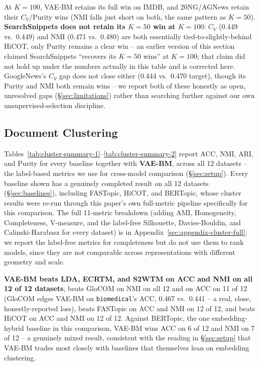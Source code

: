\documentclass[11pt]{article}
\begin{document}
At $K=100$, VAE-BM retains its full win on IMDB, and 20NG/AGNews retain their $C_V$/Purity wins (NMI falls just short on both, the same pattern as $K=50$). \textbf{SearchSnippets does not retain its $K=50$ win at $K=100$}: $C_V$ (0.449 vs.\ 0.449) and NMI (0.471 vs.\ 0.480) are both essentially tied-to-slightly-behind HiCOT, only Purity remains a clear win -- an earlier version of this section claimed SearchSnippets ``recovers its $K{=}50$ wins'' at $K{=}100$; that claim did not hold up under the numbers actually in this table and is corrected here. GoogleNews's $C_V$ gap does not close either (0.444 vs.\ 0.470 target), though its Purity and NMI both remain wins -- we report both of these honestly as open, unresolved gaps (\S\ref{sec:limitations}) rather than searching further against our own unsupervised-selection discipline.
\clearpage
\subsection{Document Clustering}
\label{sec:cluster-results}



Tables~\ref{tab:cluster-summary-1}--\ref{tab:cluster-summary-2} report ACC, NMI, ARI, and Purity for every baseline together with \textbf{VAE-BM}, across all 12 datasets -- the label-based metrics we use for cross-model comparison (\S\ref{sec:setup}). Every baseline shown has a genuinely completed result on all 12 datasets (\S\ref{sec:baselines}), including FASTopic, HiCOT, and BERTopic, whose cluster results were re-run through this paper's own full-metric pipeline specifically for this comparison. The full 11-metric breakdown (adding AMI, Homogeneity, Completeness, V-measure, and the label-free Silhouette, Davies-Bouldin, and Calinski-Harabasz for every dataset) is in Appendix~\ref{sec:appendix-cluster-full}; we report the label-free metrics for completeness but do not use them to rank models, since they are not comparable across representations with different geometry and scale.

\textbf{VAE-BM beats LDA, ECRTM, and S2WTM on ACC and NMI on all 12 of 12 datasets}, beats GloCOM on NMI on all 12 and on ACC on 11 of 12 (GloCOM edges VAE-BM on \texttt{biomedical}'s ACC, 0.467 vs.\ 0.441 -- a real, close, honestly-reported loss), beats FASTopic on ACC and NMI on 12 of 12, and beats HiCOT on ACC and NMI on 12 of 12. Against BERTopic, the one embedding-hybrid baseline in this comparison, VAE-BM wins ACC on 6 of 12 and NMI on 7 of 12 -- a genuinely mixed result, consistent with the reading in \S\ref{sec:setup} that VAE-BM trades most closely with baselines that themselves lean on embedding clustering.
\end{document}

